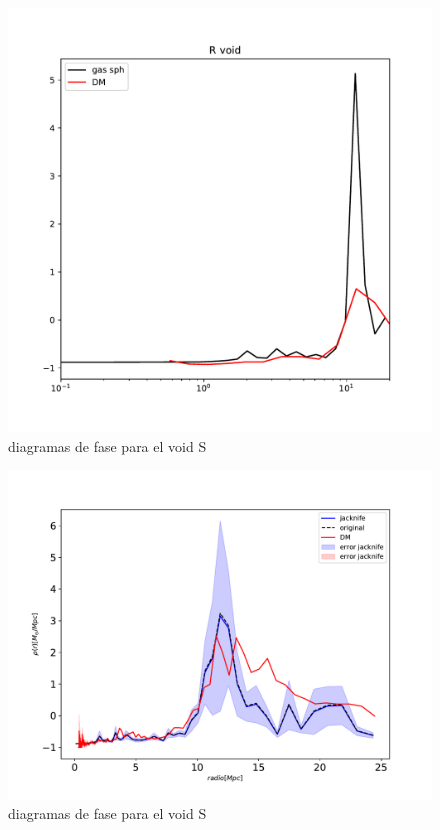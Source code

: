 \begin{figure}[h]
\centering
\includegraphics[width=15cm]{Figures/S1373_sph1.pdf}
\decoRule
\caption[asd]{diagramas de fase para el void S}
\label{fig:Electron}
\end{figure}

\begin{figure}[h]
\centering
\includegraphics[width=15cm]{Figures/S1373_sph2.pdf}
\decoRule
\caption[asd]{diagramas de fase para el void S}
\label{fig:Electron}
\end{figure}

